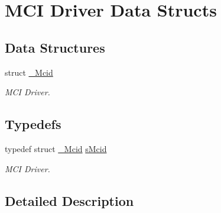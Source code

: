 \hypertarget{group__mcid__structs}{}\section{M\+CI Driver Data Structs}
\label{group__mcid__structs}
\subsection*{Data Structures}
\begin{DoxyCompactItemize}
\item 
struct \mbox{\hyperlink{struct__Mcid}{\+\_\+\+Mcid}}
\begin{DoxyCompactList}\small\item\em M\+CI Driver. \end{DoxyCompactList}\end{DoxyCompactItemize}
\subsection*{Typedefs}
\begin{DoxyCompactItemize}
\item 
\mbox{\label{group__mcid__structs_ga4c4fb535b1abc784ad83425b7a10f576}} 
typedef struct \mbox{\hyperlink{struct__Mcid}{\+\_\+\+Mcid}} \mbox{\hyperlink{group__mcid__structs_ga4c4fb535b1abc784ad83425b7a10f576}{s\+Mcid}}
\begin{DoxyCompactList}\small\item\em M\+CI Driver. \end{DoxyCompactList}\end{DoxyCompactItemize}


\subsection{Detailed Description}
